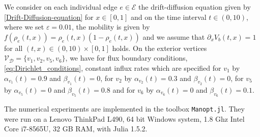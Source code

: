 We consider on each individual edge $e \in \mathcal{E}$ the drift-diffusion equation given by \cref{Drift-Diffusion-equation} for $x \in [0,1]$ and on the time interval $t \in (0, 10)$, where we set $\varepsilon = 0.01$, the mobility is given by $f(\rho_e(t,x)) = \rho_e (t,x)(1-\rho_e (t,x))$ and we assume that $\partial_x V_b (t,x) = 1$ for all $(t,x) \in (0, 10) \times [0,1]$ holds. On the exterior vertices $\mathcal{V}_{\mathcal{D}} = \{v_1, v_2, v_5, v_6 \}$, we have for flux boundary conditions, \cref{eq:Dirichlet_conditions}, constant influx rates which are specified for $v_1$ by $\alpha_{v_1}(t) = 0.9$ and $\beta_{v_1}(t) = 0$, for $v_2$ by $\alpha_{v_2}(t) = 0.3$ and $\beta_{v_2}(t) = 0$, for $v_5$ by $\alpha_{v_5}(t) = 0$ and $\beta_{v_5}(t) = 0.8$ and for $v_6$ by $\alpha_{v_6}(t) = 0$ and $\beta_{v_6}(t) = 0.1$. 



The numerical experiments are implemented in the toolbox \lstinline!Manopt.jl!. They were run on a Lenovo ThinkPad L490, 64 bit Windows system, 1.8 Ghz Intel Core i7-8565U, 32 GB RAM, with Julia 1.5.2.



